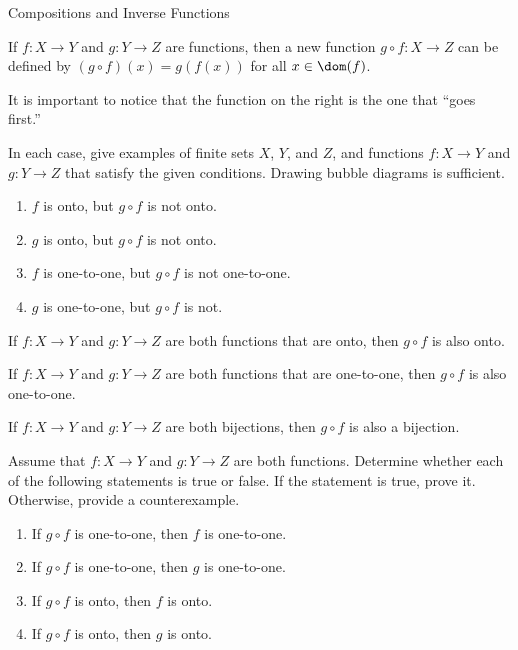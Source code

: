 \begin{section}{Compositions and Inverse Functions}

\begin{definition}
If $f:X\to Y$ and $g:Y\to Z$ are functions, then a new function $g\circ f:X\to Z$ can be defined by $(g\circ f)(x)=g(f(x))$ for all $x\in\dom(f)$.
\end{definition}

It is important to notice that the function on the right is the one that ``goes first.''

\begin{exercise}
In each case, give examples of finite sets $X$, $Y$, and $Z$, and functions $f:X\to Y$ and $g:Y\to Z$ that satisfy the given conditions.  Drawing bubble diagrams is sufficient.
\begin{enumerate}[label=\textrm{(\alph*)}]
\item $f$ is onto, but $g\circ f$ is not onto.
\item $g$ is onto, but $g\circ f$ is not onto.
\item $f$ is one-to-one, but $g\circ f$ is not one-to-one.
\item $g$ is one-to-one, but $g\circ f$ is not.
\end{enumerate}
\end{exercise}

\begin{theorem}
If $f:X\to Y$ and $g:Y\to Z$ are both functions that are onto, then $g\circ f$ is also onto.
\end{theorem}

\begin{theorem}
If $f:X\to Y$ and $g:Y\to Z$ are both functions that are one-to-one, then $g\circ f$ is also one-to-one.
\end{theorem}

\begin{corollary}
If $f:X\to Y$ and $g:Y\to Z$ are both bijections, then $g\circ f$ is also a bijection.
\end{corollary}

\begin{problem}
Assume that $f:X\to Y$ and $g:Y\to Z$ are both functions.  Determine whether each of the following statements is true or false. If the statement is true, prove it.  Otherwise, provide a counterexample.
\begin{enumerate}[label=\textrm{(\alph*)}]
\item If $g\circ f$ is one-to-one, then $f$ is one-to-one.
\item If $g\circ f$ is one-to-one, then $g$ is one-to-one.
\item If $g\circ f$ is onto, then $f$ is onto.
\item If $g\circ f$ is onto, then $g$ is onto.
\end{enumerate}
\end{problem}


\end{section}

